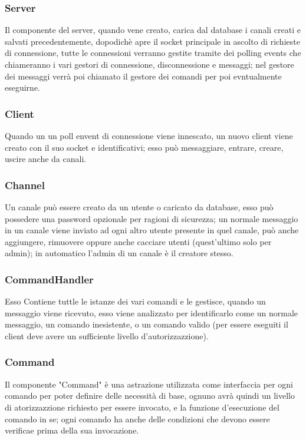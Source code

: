 \documentclass{article}
\begin{document}
\subsubsection{Server}
Il componente del server, quando vene creato, carica dal database i canali creati e salvati precedentemente, dopodichè apre il socket principale in ascolto di richieste di connessione, tutte le connessioni verranno gestite tramite dei polling events che chiameranno i vari gestori di connessione, disconnessione e messaggi; nel gestore dei messaggi verrà poi chiamato il gestore dei comandi per poi evntualmente eseguirne.

\subsubsection{Client}
Quando un un poll envent di connessione viene innescato, un nuovo client viene creato con il suo socket e identificativi; esso può messaggiare, entrare, creare, uscire anche da canali.

\subsubsection{Channel}
Un canale può essere creato da un utente o caricato da database, esso può possedere una password opzionale per ragioni di sicurezza; un normale messaggio in un canale viene inviato ad ogni altro utente presente in quel canale, può anche aggiungere, rimuovere oppure anche cacciare utenti (quest'ultimo solo per admin); in automatico l'admin di un canale è il creatore stesso.

\subsubsection{CommandHandler}
Esso Contiene tuttle le istanze dei vari comandi e le gestisce, quando un messaggio viene ricevuto, esso viene analizzato per identificarlo come un normale messaggio, un comando inesistente, o un comando valido (per essere eseguiti il client deve avere un sufficiente livello d'autorizzazzione).

\subsubsection{Command}
Il componente "Command" è una astrazione utilizzata come interfaccia per ogni comando per poter definire delle necessità di base, ognuno avrà quindi un livello di atorizzazzione richiesto per essere invocato, e la funzione d'esecuzione del comando in se; ogni comando ha anche delle condizioni che devono essere verificae prima della sua invocazione.
\end{document}
